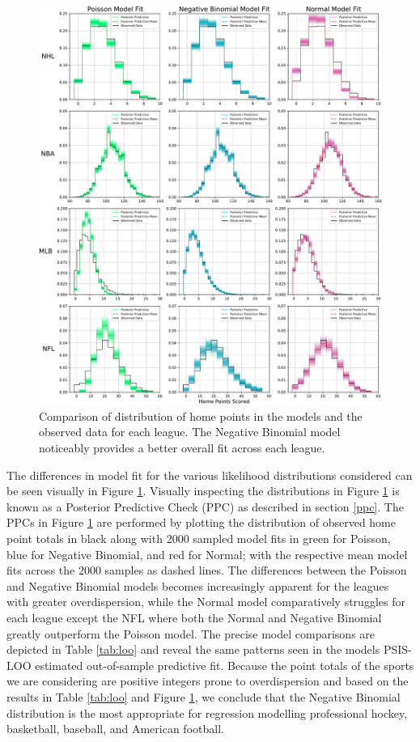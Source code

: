 \begin{figure}
	\centering
	\includegraphics[width=\textwidth]{figures/Figure_3.pdf}
	\caption{Comparison of distribution of home points in the models and the observed data for each league. The Negative Binomial model noticeably provides a better overall fit across each league.}
	\label{fig:comparisons}
\end{figure}

The differences in model fit for the various likelihood distributions considered can be seen visually in Figure \ref{fig:comparisons}. Visually inspecting the distributions in Figure \ref{fig:comparisons} is known as a Posterior Predictive Check (PPC) as described in section \ref{ppc}. The PPCs in Figure \ref{fig:comparisons} are performed by plotting the distribution of observed home point totals in black along with 2000 sampled model fits in green for Poisson, blue for Negative Binomial, and red for Normal; with the respective mean model fits across the 2000 samples as dashed lines. The differences between the Poisson and Negative Binomial models becomes increasingly apparent for the leagues with greater overdispersion, while the Normal model comparatively struggles for each league except the NFL where both the Normal and Negative Binomial greatly outperform the Poisson model. The precise model comparisons are depicted in Table \ref{tab:loo} and reveal the same patterns seen in the models PSIS-LOO estimated out-of-sample predictive fit. Because the point totals of the sports we are considering are positive integers prone to overdispersion and based on the results in Table \ref{tab:loo} and Figure \ref{fig:comparisons}, we conclude that the Negative Binomial distribution is the most appropriate for regression modelling professional hockey, basketball, baseball, and American football.

